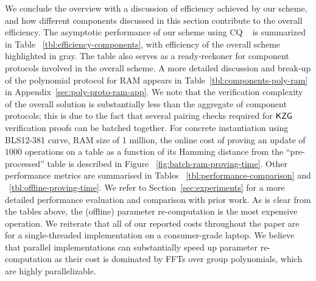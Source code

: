  We conclude the overview with a discussion of efficiency achieved by our scheme, and
how different components discussed in this section contribute to the overall efficiency. The asymptotic performance
of our scheme using CQ ~\cite{EPRINT:EagFioGab22} is summarized in Table ~\ref{tbl:efficiency-components}, with
efficiency of the overall scheme highlighted in gray. The table also serves as a ready-reckoner for component protocols
involved in the overall scheme. A more detailed discussion and break-up of the polynomial protocol for RAM
appears in Table~\ref{tbl:components-poly-ram} in Appendix~\ref{sec:poly-proto-ram-app}. We note that the verification complexity of the overall solution is substantially
less than the aggregate of component protocols; this is due to the fact that several pairing checks required for
$\mathsf{KZG}$ verification proofs can be batched together. For concrete instantiation using BLS12-381 curve, RAM size
of 1 million, the online cost of proving an update of $1000$ operations on a table as a function of its
Hamming distance from the ``pre-processed'' table is described in Figure ~\ref{fig:batch-ram-proving-time}.
Other performance metrics are summarised in Tables ~\ref{tbl:performance-comparison} and ~\ref{tbl:offline-proving-time}.
We refer to Section~\ref{sec:experiments} for a more detailed performance evaluation and comparison with prior work.
As is clear from the tables above, the (offline) parameter re-computation is the most expensive operation.
We reiterate that all of our reported costs throughout the paper are for a single-threaded implementation on a consumer-grade laptop.
We believe that parallel implementations can
substantially speed up parameter re-computation as their cost is dominated by FFTs over group polynomials, which
are highly parallelizable.

\smallskip

